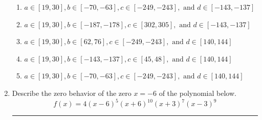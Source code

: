 \documentclass[14pt]{extbook}
\newcommand{\litem}[1]{\item#1\hspace*{-1cm}\rule{\textwidth}{0.4pt}}
\begin{document}
\begin{enumerate}
{\begin{enumerate}[label=\Alph*.]
\item \( a \in [19, 30], b \in [-70, -63], c \in [-249, -243], \text{ and } d \in [-143, -137] \)
\item \( a \in [19, 30], b \in [-187, -178], c \in [302, 305], \text{ and } d \in [-143, -137] \)
\item \( a \in [19, 30], b \in [62, 76], c \in [-249, -243], \text{ and } d \in [140, 144] \)
\item \( a \in [19, 30], b \in [-143, -137], c \in [45, 48], \text{ and } d \in [140, 144] \)
\item \( a \in [19, 30], b \in [-70, -63], c \in [-249, -243], \text{ and } d \in [140, 144] \)

\end{enumerate} }
\litem{
Describe the zero behavior of the zero $x = -6$ of the polynomial below.\[ f(x) = 4(x - 6)^{5}(x + 6)^{10}(x + 3)^{7}(x - 3)^{9} \]\begin{enumerate}[label=\Alph*.]

\end{enumerate}}
\end{enumerate}
\end{document}

